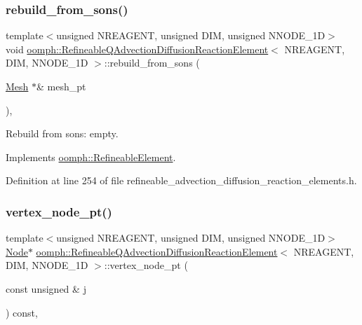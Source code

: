 \subsubsection{\texorpdfstring{rebuild\+\_\+from\+\_\+sons()}{rebuild\_from\_sons()}}
{\footnotesize\ttfamily template$<$unsigned N\+R\+E\+A\+G\+E\+NT, unsigned D\+IM, unsigned N\+N\+O\+D\+E\+\_\+1D$>$ \\
void \hyperlink{classoomph_1_1RefineableQAdvectionDiffusionReactionElement}{oomph\+::\+Refineable\+Q\+Advection\+Diffusion\+Reaction\+Element}$<$ N\+R\+E\+A\+G\+E\+NT, D\+IM, N\+N\+O\+D\+E\+\_\+1D $>$\+::rebuild\+\_\+from\+\_\+sons (\begin{DoxyParamCaption}\item[{\hyperlink{classoomph_1_1Mesh}{Mesh} $\ast$\&}]{mesh\+\_\+pt }\end{DoxyParamCaption})\hspace{0.3cm}{\ttfamily [inline]}, {\ttfamily [virtual]}}



Rebuild from sons\+: empty. 



Implements \hyperlink{classoomph_1_1RefineableElement_a33324be27833fa4b78279d17158215fa}{oomph\+::\+Refineable\+Element}.



Definition at line 254 of file refineable\+\_\+advection\+\_\+diffusion\+\_\+reaction\+\_\+elements.\+h.

\mbox{\label{classoomph_1_1RefineableQAdvectionDiffusionReactionElement_a9e14ec5dac9dabd46547d8724f502ff4}} 
\subsubsection{\texorpdfstring{vertex\+\_\+node\+\_\+pt()}{vertex\_node\_pt()}}
{\footnotesize\ttfamily template$<$unsigned N\+R\+E\+A\+G\+E\+NT, unsigned D\+IM, unsigned N\+N\+O\+D\+E\+\_\+1D$>$ \\
\hyperlink{classoomph_1_1Node}{Node}$\ast$ \hyperlink{classoomph_1_1RefineableQAdvectionDiffusionReactionElement}{oomph\+::\+Refineable\+Q\+Advection\+Diffusion\+Reaction\+Element}$<$ N\+R\+E\+A\+G\+E\+NT, D\+IM, N\+N\+O\+D\+E\+\_\+1D $>$\+::vertex\+\_\+node\+\_\+pt (\begin{DoxyParamCaption}\item[{const unsigned \&}]{j }\end{DoxyParamCaption}) const\hspace{0.3cm}{\ttfamily [inline]}, {\ttfamily [virtual]}}



